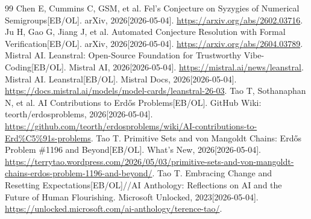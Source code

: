 \begin{thebibliography}{99}
 Chen E, Cummins C, GSM, et al. Fel's Conjecture on Syzygies of Numerical Semigroups[EB/OL]. arXiv, 2026[2026-05-04]. \url{https://arxiv.org/abs/2602.03716}.
 Ju H, Gao G, Jiang J, et al. Automated Conjecture Resolution with Formal Verification[EB/OL]. arXiv, 2026[2026-05-04]. \url{https://arxiv.org/abs/2604.03789}.
 Mistral AI. Leanstral: Open-Source Foundation for Trustworthy Vibe-Coding[EB/OL]. Mistral AI, 2026[2026-05-04]. \url{https://mistral.ai/news/leanstral}.
 Mistral AI. Leanstral[EB/OL]. Mistral Docs, 2026[2026-05-04]. \url{https://docs.mistral.ai/models/model-cards/leanstral-26-03}.
 Tao T, Sothanaphan N, et al. AI Contributions to Erdős Problems[EB/OL]. GitHub Wiki: teorth/erdosproblems, 2026[2026-05-04]. \url{https://github.com/teorth/erdosproblems/wiki/AI-contributions-to-Erd%C5%91s-problems}.
 Tao T. Primitive Sets and von Mangoldt Chains: Erdős Problem \#1196 and Beyond[EB/OL]. What's New, 2026[2026-05-04]. \url{https://terrytao.wordpress.com/2026/05/03/primitive-sets-and-von-mangoldt-chains-erdos-problem-1196-and-beyond/}.
 Tao T. Embracing Change and Resetting Expectations[EB/OL]//AI Anthology: Reflections on AI and the Future of Human Flourishing. Microsoft Unlocked, 2023[2026-05-04]. \url{https://unlocked.microsoft.com/ai-anthology/terence-tao/}.
\end{thebibliography}
